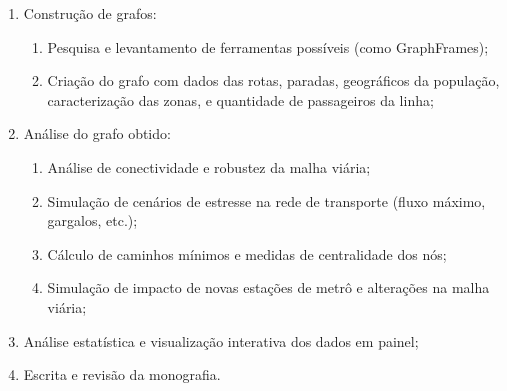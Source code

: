\begin{enumerate}
    \item Construção de grafos:
    \begin{enumerate}
    \item  Pesquisa e levantamento de ferramentas possíveis (como GraphFrames);
    \item  Criação do grafo com dados das rotas, paradas, geográficos da população, caracterização das zonas, e  quantidade de passageiros da linha;
    \end{enumerate}
    \item Análise do grafo obtido:
    \begin{enumerate}
    \item Análise de conectividade e robustez da malha viária;
    \item Simulação de cenários de estresse na rede de transporte (fluxo máximo, gargalos, etc.);
    \item Cálculo de caminhos mínimos e medidas de centralidade dos nós;
    \item Simulação de impacto de novas estações de metrô e alterações na malha viária;
     \end{enumerate}
     
    \item Análise estatística e visualização interativa dos dados em painel;
    \item Escrita e revisão da monografia.
\end{enumerate}